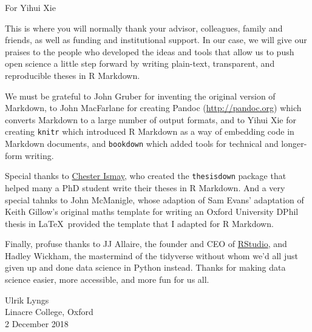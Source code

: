 \documentclass[a4paper, twoside]{templates/ociamthesis}
\begin{document}
\begin{romanpages}

\maketitle

\begin{dedication}
  For Yihui Xie
\end{dedication}

\begin{acknowledgements}
 	This is where you will normally thank your advisor, colleagues, family and friends, as well as funding and institutional support. In our case, we will give our praises to the people who developed the ideas and tools that allow us to push open science a little step forward by writing plain-text, transparent, and reproducible theses in R Markdown.

  We must be grateful to John Gruber for inventing the original version of Markdown, to John MacFarlane for creating Pandoc (\url{http://pandoc.org}) which converts Markdown to a large number of output formats, and to Yihui Xie for creating \texttt{knitr} which introduced R Markdown as a way of embedding code in Markdown documents, and \texttt{bookdown} which added tools for technical and longer-form writing.

  Special thanks to \href{http://chester.rbind.io}{Chester Ismay}, who created the \texttt{thesisdown} package that helped many a PhD student write their theses in R Markdown. And a very special tahnks to John McManigle, whose adaption of Sam Evans' adaptation of Keith Gillow's original maths template for writing an Oxford University DPhil thesis in \LaTeX~provided the template that I adapted for R Markdown.

  Finally, profuse thanks to JJ Allaire, the founder and CEO of \href{http://rstudio.com}{RStudio}, and Hadley Wickham, the mastermind of the tidyverse without whom we'd all just given up and done data science in Python instead. Thanks for making data science easier, more accessible, and more fun for us all.

  \begin{flushright}
  Ulrik Lyngs \\
  Linacre College, Oxford \\
  2 December 2018
  \end{flushright}
\end{acknowledgements}



\end{romanpages}
\end{document}
